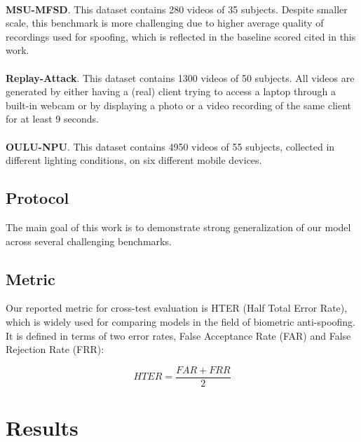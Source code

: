 \documentclass[10pt,twocolumn,letterpaper]{article}
\begin{document}
\paragraph{}\textbf{MSU-MFSD}. This dataset contains 280 videos of 35 subjects. Despite smaller scale, this benchmark is more challenging due to higher average quality of recordings used for spoofing, which is reflected in the baseline scored cited in this work.

\paragraph{} \textbf{Replay-Attack}. This dataset contains 1300 videos of 50 subjects. All videos are generated by either having a (real) client trying to access a laptop through a built-in webcam or by displaying a photo or a video recording of the same client for at least 9 seconds.

\paragraph{} \textbf{OULU-NPU}. This dataset contains 4950 videos of 55 subjects, collected in different lighting conditions, on six different mobile devices.

\subsection{Protocol}

The main goal of this work is to demonstrate strong generalization of our model across several challenging benchmarks. 

\subsection{Metric}

Our reported metric for cross-test evaluation is HTER (Half Total Error Rate)\cite{HTER}, which is widely used for comparing models in the field of biometric anti-spoofing. It is defined in terms of two error rates, False Acceptance Rate (FAR) and False Rejection Rate (FRR):

\begin{equation}
    HTER = \frac{FAR + FRR}{2}
\end{equation}

\section{Results}
\end{document}

